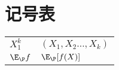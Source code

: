 \section*{记号表}

\begin{tabular}{p{} p{}}
\hline
	$X_1^k$ & $(X_1, X_2 \dots, X_k)$ \\
	$\E_{\P} f$ & $\E_{\P} [f(X)]$
\end{tabular}
